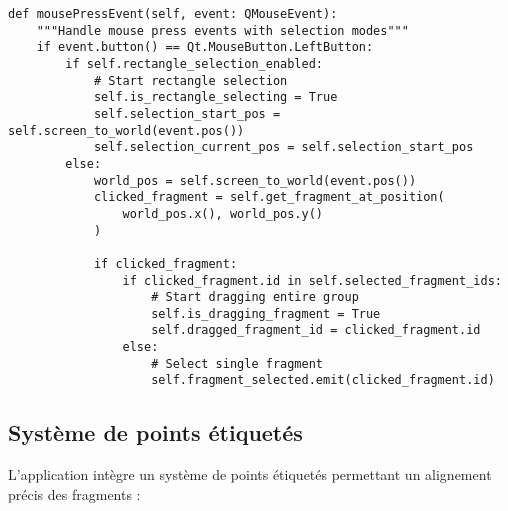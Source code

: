 \documentclass[12pt,a4paper]{report}
\begin{document}
\begin{lstlisting}[caption=Gestion de la sélection rectangle]
def mousePressEvent(self, event: QMouseEvent):
    """Handle mouse press events with selection modes"""
    if event.button() == Qt.MouseButton.LeftButton:
        if self.rectangle_selection_enabled:
            # Start rectangle selection
            self.is_rectangle_selecting = True
            self.selection_start_pos = self.screen_to_world(event.pos())
            self.selection_current_pos = self.selection_start_pos
        else:
            world_pos = self.screen_to_world(event.pos())
            clicked_fragment = self.get_fragment_at_position(
                world_pos.x(), world_pos.y()
            )
            
            if clicked_fragment:
                if clicked_fragment.id in self.selected_fragment_ids:
                    # Start dragging entire group
                    self.is_dragging_fragment = True
                    self.dragged_fragment_id = clicked_fragment.id
                else:
                    # Select single fragment
                    self.fragment_selected.emit(clicked_fragment.id)
\end{lstlisting}

\subsection{Système de points étiquetés}

L'application intègre un système de points étiquetés permettant un alignement précis des fragments :
\end{document}
